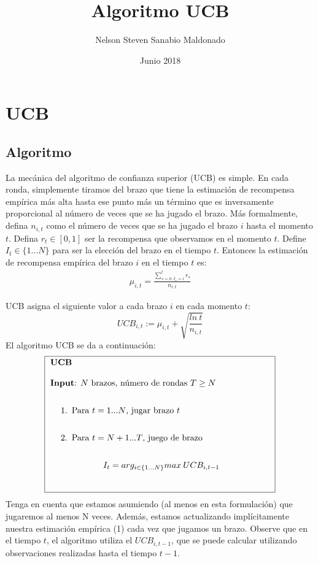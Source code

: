 \documentclass{article}
\title{Algoritmo UCB}
\author{Nelson Steven Sanabio Maldonado}
\date{Junio 2018}
\begin{document}
\maketitle
\section{UCB}
\subsection{Algoritmo}

La mecánica del algoritmo de confianza superior (UCB) es
simple. En cada ronda, simplemente tiramos del brazo que tiene la estimaci\'on de recompensa emp\'irica m\'as alta hasta ese punto m\'as un t\'ermino que es inversamente
proporcional al n\'umero de veces que se ha jugado el brazo. M\'as formalmente, defina $n_{i,t}$ como el n\'umero de veces que se ha jugado el brazo $i$ hasta el momento $t$. Defina $r_t \in [0, 1]$ ser la recompensa que observamos en el momento $t$. Define $I_t \in \{1. . . N\}$ para ser la elección del brazo en el tiempo $t$. Entonces la estimación de recompensa empírica del brazo $i$ en el tiempo $t$ es:
\begin{gather}
\mu_{i,t} = \frac{\sum_{s=0\colon I_s=i}^{t}r_s }{n_{i,t}}    
\end{gather}


UCB asigna el siguiente valor a cada brazo $i$ en cada momento $t$:$$UCB_{i,t} := \mu_{i,t} + \sqrt{\frac{ln\>t }{n_{i,t}}}$$
El algoritmo UCB se da a continuación:
$$ 
\framebox{
\begin{minipage}[b][1.2\height]%
[t]{0.75\textwidth} \textbf{UCB}\\\\
\textbf{Input}: $N$ brazos, número de rondas $T\geq N$\\
\begin{enumerate}
    \item Para $t=1 ... N$, jugar brazo $t$\\
    \item Para $t = N+1 ... T$, juego de brazo\\
\end{enumerate}
$$I_t = arg_{i \in \{1...N\} } max \>UCB_{i,t-1}$$
\end{minipage}}$$
Tenga en cuenta que estamos asumiendo (al menos en esta formulación) que jugaremos al menos N veces. Además, estamos actualizando implícitamente nuestra estimación empírica (1) cada vez que jugamos un brazo. Observe que en el tiempo $t$, el algoritmo utiliza el $UCB_{i, t-1}$, que se puede calcular utilizando observaciones realizadas hasta el tiempo $t - 1$.
\end{document}
